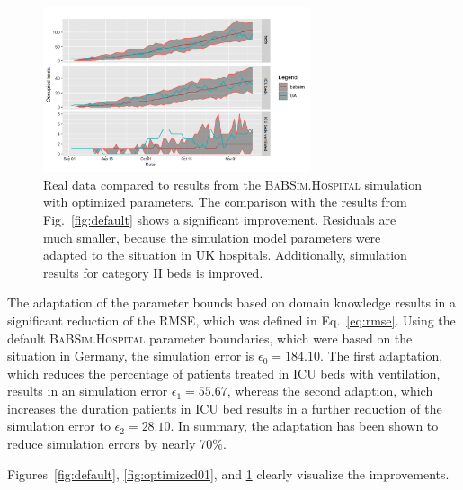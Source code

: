 \documentclass[conference]{IEEEtran}
\newcommand{\babsimhospital}{\textsc{BaBSim.Hospital}\xspace}
\begin{document}
\begin{figure}
    \centering
    \includegraphics[width=0.7\textwidth]{optimized.png}
    \caption{Real data compared to results from the \babsimhospital simulation with optimized parameters. The comparison with the results from Fig.~\ref{fig:default} shows a significant improvement. Residuals are much smaller,
    because the simulation model parameters were adapted to the situation in UK hospitals. Additionally, simulation results for category II beds is improved.  
  }
\label{fig:optimized}
\end{figure}

The adaptation of the parameter bounds based on domain knowledge results in a significant reduction of the \gls{RMSE}, which was defined in  Eq.~\ref{eq:rmse}. 
Using the default \babsimhospital parameter boundaries, which were based on the situation in Germany, the simulation error is $\epsilon_0 = 184.10$.
The first adaptation, which reduces the percentage of patients treated in \gls{ICU} beds with ventilation, results in an simulation error $\epsilon_1 =  55.67$, whereas the second adaption, which increases the duration patients in \gls{ICU} bed results in a further reduction of the simulation error to $\epsilon_2 = 28.10$. In summary, the adaptation has been shown to reduce simulation errors by nearly 70\%.

Figures~\ref{fig:default}, \ref{fig:optimized01}, and \ref{fig:optimized} clearly visualize the improvements.
\end{document}
